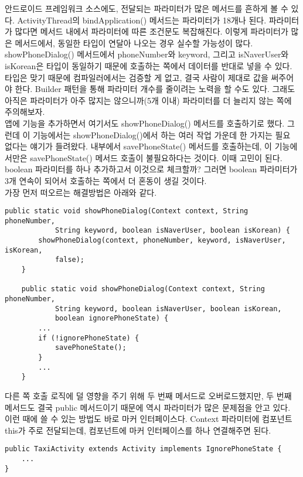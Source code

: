 안드로이드 프레임워크 소스에도, 전달되는 파라미터가 많은 메서드를 흔하게 볼 수 있다. ActivityThread의 bindApplication() 메서드는 파라미터가 18개나 된다.
파라미터가 많다면 메서드 내에서 파라미터에 따른 조건문도 복잡해진다.
이렇게 파라미터가 많은 메서드에서, 동일한 타입이 연달아 나오는 경우 실수할 가능성이 많다. 
showPhoneDialog() 메서드에서 phoneNumber와 keyword, 그리고 isNaverUser와 isKorean은 타입이 동일하기 때문에 호출하는 쪽에서 데이터를 반대로 넣을 수 있다.
타입은 맞기 때문에 컴파일러에서는 검증할 게 없고, 결국 사람이 제대로 값을 써주어야 한다.
Builder 패턴을 통해 파라미터 개수를 줄이려는 노력을 할 수도 있다. 그래도 아직은 파라미터가 아주 많지는 않으니까(5개 이내) 파라미터를 더 늘리지 않는 쪽에 주의해보자.\\

앱에 기능을 추가하면서 여기서도 showPhoneDialog() 메서드를 호출하기로 했다.
그런데 이 기능에서는 showPhoneDialog()에서 하는 여러 작업 가운데 한 가지는 필요 없다는 얘기가 들려왔다. 
내부에서 savePhoneState() 메서드를 호출하는데, 이 기능에서만은 savePhoneState() 메서드 호출이 불필요하다는 것이다.
이때 고민이 된다. boolean 파라미터를 하나 추가하고서 이것으로 체크할까? 
그러면 boolean 파라미터가 3개 연속이 되어서 호출하는 쪽에서 더 혼동이 생길 것이다.\\

가장 먼저 떠오르는 해결방법은 아래와 같다.
\begin{lstlisting}[frame=single]
	public static void showPhoneDialog(Context context, String phoneNumber, 
			String keyword, boolean isNaverUser, boolean isKorean) {
		showPhoneDialog(context, phoneNumber, keyword, isNaverUser, isKorean, 
			false);
	}

	public static void showPhoneDialog(Context context, String phoneNumber, 
			String keyword, boolean isNaverUser, boolean isKorean, 
			boolean ignorePhoneState) {
		...
		if (!ignorePhoneState) {
			savePhoneState();
		}
		...
	}
\end{lstlisting}
다른 쪽 호출 로직에 덜 영향을 주기 위해 두 번째 메서드로 오버로드했지만, 두 번째 메서드도 결국 public 메서드이기 때문에 역시 파라미터가 많은 문제점을 안고 있다.\\ 

이런 때에 쓸 수 있는 방법도 바로 마커 인터페이스다. Context 파라미터에 컴포넌트 this가 주로 전달되는데, 컴포넌트에 마커 인터페이스를 하나 연결해주면 된다.

\begin{lstlisting}[frame=single]
public TaxiActivity extends Activity implements IgnorePhoneState {
	...
}
\end{lstlisting}

